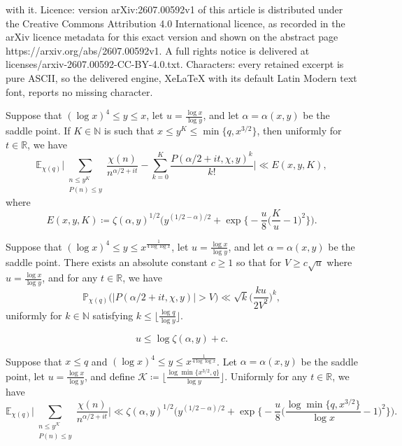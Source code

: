 \documentclass[10pt,a4paper]{amsart}
\newcommand{\E}{\mathbb{E}}
\newcommand{\N}{\mathbb{N}}
\newcommand{\R}{\mathbb{R}}
\newcommand{\p}{\mathbb{P}}
\begin{document}
with it. Licence: version arXiv:2607.00592v1 of this article is distributed under the Creative Commons Attribution 4.0 International licence, as recorded in the arXiv licence metadata for this exact version and shown on the abstract page https://arxiv.org/abs/2607.00592v1. A full rights notice is delivered at licenses/arxiv-2607.00592-CC-BY-4.0.txt. Characters: every retained excerpt is pure ASCII, so the delivered engine, XeLaTeX with its default Latin Modern text font, reports no missing character.
\begin{lemma}\label{l: good generating function}
Suppose that $(\log x)^4 \leq y \leq x$, let $u = \frac{\log x}{\log y}$, and let $\alpha = \alpha (x,y) $ be the saddle point. If $K \in \N$ is such that $x \leq y^K \leq \min \{ q, x^{3/2} \}$, then uniformly for $t \in \R$, we have
\[
\E_{\chi (q)} \biggl| \sum_{\substack{n \leq y^K \\ P(n) \leq y}} \frac{\chi(n)}{n^{\alpha / 2 + it}} - \sum_{k = 0}^{K} \frac{P (\alpha / 2 + it, \chi, y)^{k}}{k!} \biggr| \ll E (x, y, K), 
\]
where
\[
E (x, y, K) \coloneqq \zeta (\alpha, y)^{1/2} \biggl(y^{(1/2 - \alpha)/2} + \exp \biggl\{ - \frac{u}{8} \biggl( \frac{K}{u} -1 \biggr)^2 \biggr\} \biggr).
\]
\end{lemma}

\begin{lemma}\label{l: large value bound}
Suppose that $(\log x)^4 \leq y \leq x^{\frac{1}{4 \log \log x}}$, let $u = \frac{\log x}{\log y}$, and let $\alpha = \alpha (x,y)$ be the saddle point. There exists an absolute constant $c \geq 1$ so that for $V \geq c \sqrt{u}$ where $u=\frac{\log x}{\log y}$, and for any $t \in \R$, we have
\[
\p_{\chi(q)} \bigl( |P(\alpha / 2 + it, \chi , y) | > V \bigr) \ll \sqrt{k} \biggl( \frac{k u}{2 V^2} \biggr)^{k} ,
\]
uniformly for $k \in \N$ satisfying $k \leq \lfloor \frac{\log q}{\log y} \rfloor$.
\end{lemma}

\begin{equation}\label{equ: u upper bound log zeta}
u \leq \log \zeta (\alpha, y) + c.
\end{equation}

\begin{proposition}\label{p: L1 norm}
Suppose that $x \leq q$ and $(\log x)^4 \leq y \leq x^{\frac{1}{4 \log \log x}}$. Let $\alpha = \alpha (x,y)$ be the saddle point, let $u = \frac{\log x}{\log y}$, and define $\mathcal{K} \coloneqq \lfloor \frac{\log \min \{ x^{3/2}, q \}}{\log y} \rfloor$. Uniformly for any $t \in \R$, we have
\[
\E_{\chi (q)} \biggl| \sum_{\substack{n \leq y^{\mathcal{K}} \\ P(n) \leq y}} \frac{\chi(n)}{n^{\alpha / 2 + it}} \biggr| \ll \zeta (\alpha, y)^{1/2} \biggl(y^{(1/2 - \alpha)/2} + \exp \biggl\{ - \frac{u}{8} \biggl( \frac{\log \min\{ q, x^{3/2} \}}{\log x} - 1 \biggr)^2 \biggr\} \biggr).
\]
\end{proposition}
\end{document}
